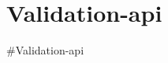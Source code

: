 \chapter{Validation-\/api}
\hypertarget{index}{}\label{index}
\label{index_md_Readme}%
%
\#\+Validation-\/api 